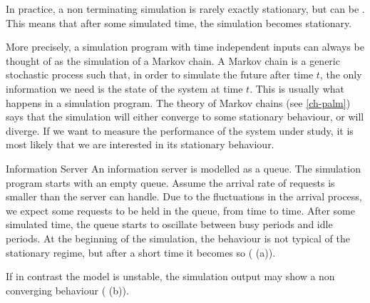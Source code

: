 In practice, a non terminating simulation is rarely exactly
stationary, but can be . This means
that after some simulated time, the simulation becomes stationary.

More precisely, a simulation program with time independent inputs
can always be thought of as the simulation of a Markov chain. A
Markov chain is a generic stochastic process such that, in order
to simulate the future after time $t$, the only information we
need is the state of the system at time $t$. This is usually what
happens in a simulation program. The theory of Markov chains (see
\cref{ch-palm}) says that the simulation will either converge to
some stationary behaviour, or will diverge. If we want to measure
the performance of the system under study, it is most likely that
we are interested in its stationary behaviour.

\begin{figure}[!htb]
 \begin{center}
 \end{center}
\end{figure}
%
\begin{ex}{Information Server}
\label{ex-sim-des0} An information server is modelled as a queue.
The simulation program starts with an empty queue. Assume the
arrival rate of requests is smaller than the server can handle.
Due to the fluctuations in the arrival process, we expect some
requests to be held in the queue, from time to time. After some
simulated time, the queue starts to oscillate between busy periods
and idle periods. At the beginning of the simulation, the
behaviour is not typical of the stationary regime, but after a
short time it becomes so ( (a)).

If in contrast the model is unstable, the simulation output may
show a non converging behaviour ( (b)).
\end{ex}

